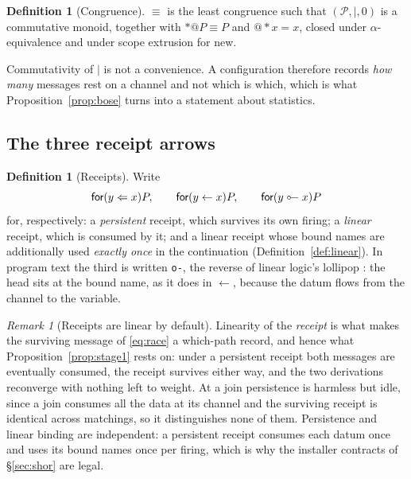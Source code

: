 \documentclass[11pt,a4paper]{article}
\theoremstyle{plain}
\theoremstyle{definition}
\newtheorem{definition}[theorem]{Definition}
\theoremstyle{remark}
\newtheorem{remark}[theorem]{Remark}
\newcommand{\Proc}{\mathcal{P}}
\newcommand{\scong}{\equiv}
\newcommand{\lolli}{\mathrel{\reflectbox{$\multimap$}}}
\begin{document}
\begin{definition}[Congruence]\label{def:cong}
$\scong$ is the least congruence such that $(\Proc, \mid, 0)$ is a commutative
monoid, together with $*@P \scong P$ and $@{*}x = x$, closed under
$\alpha$-equivalence and under scope extrusion for \textsf{new}.
\end{definition}

Commutativity of $\mid$ is not a convenience. A configuration therefore records
\emph{how many} messages rest on a channel and not which is which, which is what
Proposition~\ref{prop:bose} turns into a statement about statistics.

\subsection{The three receipt arrows}

\begin{definition}[Receipts]\label{def:arrows}
Write
\[
  \textsf{for}(y \Leftarrow x)P, \qquad
  \textsf{for}(y \leftarrow x)P, \qquad
  \textsf{for}(y \lolli x)P
\]
for, respectively: a \emph{persistent} receipt, which survives its own firing; a
\emph{linear} receipt, which is consumed by it; and a linear receipt whose bound
names are additionally used \emph{exactly once} in the continuation
(Definition~\ref{def:linear}). In program text the third is written
\texttt{o-}, the reverse of linear logic's lollipop \cite{Girard}: the head sits
at the bound name, as it does in $\leftarrow$, because the datum flows from the
channel to the variable.
\end{definition}

\begin{remark}[Receipts are linear by default]\label{rem:linear}
Linearity of the \emph{receipt} is what makes the surviving message of
\eqref{eq:race} a which-path record, and hence what
Proposition~\ref{prop:stage1} rests on: under a persistent receipt both messages
are eventually consumed, the receipt survives either way, and the two
derivations reconverge with nothing left to weight. At a join persistence is
harmless but idle, since a join consumes all the data at its channel and the
surviving receipt is identical across matchings, so it distinguishes none of
them. Persistence and linear binding are independent: a persistent receipt
consumes each datum once and uses its bound names once per firing, which is why
the installer contracts of \S\ref{sec:shor} are legal.
\end{remark}
\end{document}
